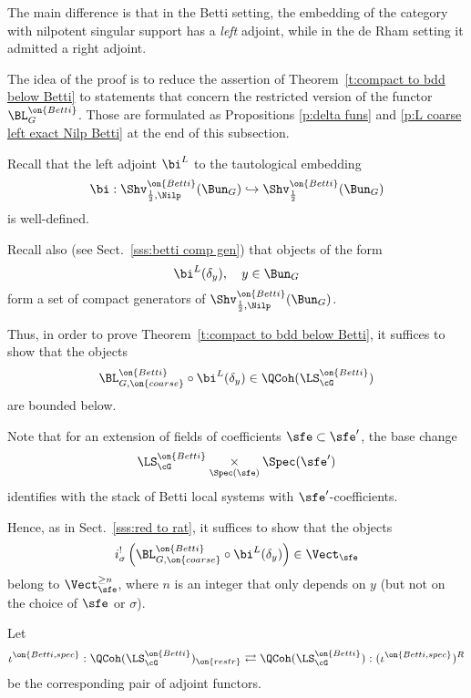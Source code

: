 \documentclass[9pt]{amsart}
\theoremstyle{remark}
\theoremstyle{definition}
\theoremstyle{remark}
\newcommand{\thmref}[1]{Theorem~\ref{#1}}
\newcommand{\secref}[1]{Sect.~\ref{#1}}
\numberwithin{equation}{section}
\begin{document}
\medskip

The main difference is that in the Betti setting, the embedding of the category with nilpotent 
singular support has a \emph{left} adjoint, while in the de Rham setting it admitted a right adjoint. 


The idea of the proof is to reduce the assertion of \thmref{t:compact to bdd below Betti} to statements
that concern the restricted version of the functor $\BL_G^{\on{Betti}}$. Those are formulated as
Propositions \ref{p:delta funs} and \ref{p:L coarse left exact Nilp Betti} at the end of this subsection. 

\sssec{}

Recall that the left adjoint $\bi^L$ to the tautological embedding 
$$\bi:\Shv^{\on{Betti}}_{\frac{1}{2},\Nilp}(\Bun_G)\hookrightarrow \Shv^{\on{Betti}}_{\frac{1}{2}}(\Bun_G)$$
is well-defined. 

\medskip

Recall also (see \secref{sss:betti comp gen}) that objects of the form 
$$\bi^L(\delta_y), \quad y\in \Bun_G$$
form a set of compact generators of $\Shv^{\on{Betti}}_{\frac{1}{2},\Nilp}(\Bun_G)$.

\medskip

Thus, in order to prove \thmref{t:compact to bdd below Betti}, it suffices to show that the objects
$$\BL^{\on{Betti}}_{G,\on{coarse}}\circ \bi^L(\delta_y)\in \QCoh(\LS^{\on{Betti}}_\cG)$$
are bounded below. 

\sssec{}

Note that for an extension of fields of coefficients $\sfe\subset \sfe'$, the base change
$$\LS^{\on{Betti}}_\cG\underset{\Spec(\sfe)}\times \Spec(\sfe')$$
identifies with the stack of Betti local systems with $\sfe'$-coefficients.

\medskip

Hence, as in \secref{sss:red to rat}, it suffices to show that the objects
$$i_\sigma^! \left(\BL^{\on{Betti}}_{G,\on{coarse}}\circ \bi^L(\delta_y)\right)\in \Vect_\sfe$$
belong to $\Vect_\sfe^{\geq n}$, where $n$ is an integer that only depends on $y$
(but not on the choice of $\sfe$ or $\sigma$). 

\sssec{}

Let
$$\iota^{\on{Betti,spec}}:\QCoh(\LS^{\on{Betti}}_\cG)_{\on{restr}}\rightleftarrows \QCoh(\LS^{\on{Betti}}_\cG):(\iota^{\on{Betti,spec}})^R$$
be the corresponding pair of adjoint functors. 

\medskip
\end{document}
